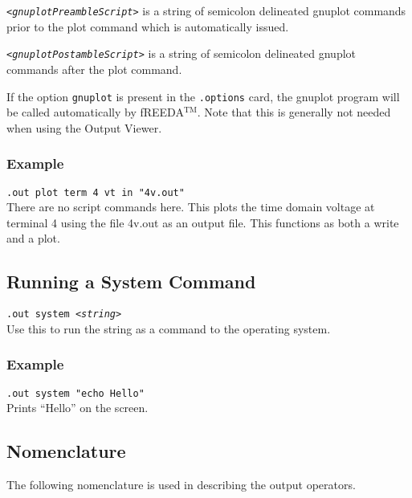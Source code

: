 {\tt<{\it gnuplotPreambleScript}>} is a string of semicolon delineated
gnuplot commands prior to the plot command which is automatically
issued.

{\tt<{\it gnuplotPostambleScript}>} is a string of semicolon delineated
gnuplot commands after the plot command.

If the option {\tt gnuplot} is present in the {\tt .options} card, the
gnuplot program will be called automatically by fREEDA$^{\mathrm{TM}}$. Note that
this is generally not needed when using the Output Viewer.


\subsubsection{Example}

{\tt .out plot term 4 vt in "4v.out"} \medskip
\\
There are no script commands here. This plots the time domain voltage
at terminal 4 using the file 4v.out as an output file. This functions
as both a write and a plot.

\subsection{Running a System Command}

{\tt .out system <{\it string}>} \medskip
\\
Use this to run the string as a command to the operating system.

\subsubsection{Example}

{\tt .out system "echo Hello"} \medskip
\\
Prints ``Hello'' on the screen.

\subsection{Nomenclature}

The following nomenclature is used in describing the output operators.

